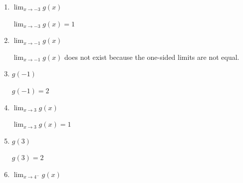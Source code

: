 \documentclass{article}
\begin{document}
\begin{enumerate}[resume]
\begin{enumerate}
    \item
      \begin{problem}
        $\displaystyle \lim_{x \rightarrow -3} g(x)$
      \end{problem}

      \begin{solution}
        $\displaystyle \lim_{x \rightarrow -3} g(x)=1$
      \end{solution}

    \item
      \begin{problem}
        $\displaystyle \lim_{x \rightarrow -1} g(x)$
      \end{problem}

      \begin{solution}
        $\displaystyle \lim_{x \rightarrow -1} g(x)$ does not exist because the one-sided limits
        are not equal.
      \end{solution}

    \item
      \begin{problem}
        $g(-1)$
      \end{problem}

      \begin{solution}
       $g(-1)=2$
      \end{solution}

    \item
      \begin{problem}
        $\displaystyle \lim_{x \rightarrow 3} g(x)$
      \end{problem}

      \begin{solution}
        $\displaystyle \lim_{x \rightarrow 3} g(x) = 1$
      \end{solution}

    \item
      \begin{problem}
        $g(3)$
      \end{problem}

      \begin{solution}
        $g(3) = 2$
      \end{solution}

    \item
      \begin{problem}
        $\displaystyle \lim_{x \rightarrow 4^-} g(x)$
      \end{problem}


\end{enumerate}
\end{enumerate}
\end{document}
